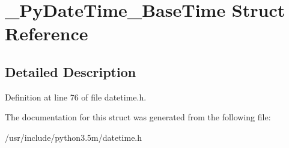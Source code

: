 \hypertarget{struct__PyDateTime__BaseTime}{}\section{\+\_\+\+Py\+Date\+Time\+\_\+\+Base\+Time Struct Reference}
\label{struct__PyDateTime__BaseTime}


\subsection{Detailed Description}


Definition at line 76 of file datetime.\+h.



The documentation for this struct was generated from the following file\+:\begin{DoxyCompactItemize}
\item 
/usr/include/python3.\+5m/datetime.\+h\end{DoxyCompactItemize}

